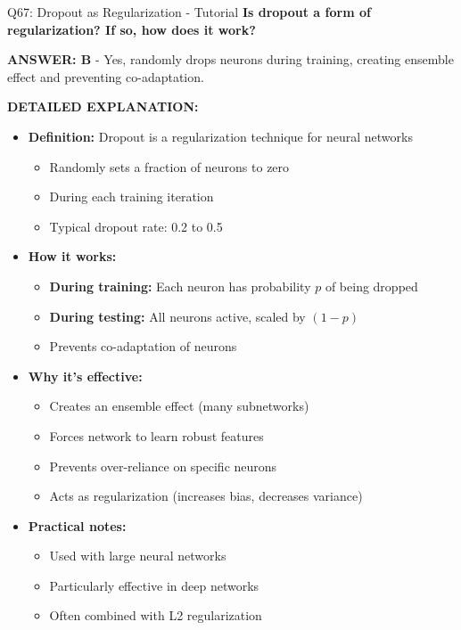 \documentclass[8pt]{beamer}
\begin{document}
	\begin{frame}{Q67: Dropout as Regularization - Tutorial}
		\fontsize{6.5}{7.5}\selectfont
		\textbf{Is dropout a form of regularization? If so, how does it work?}
		
		\vspace{0.05cm}
		\textcolor{myblue}{\textbf{ANSWER: B}} - Yes, randomly drops neurons during training, creating ensemble effect and preventing co-adaptation.
		
		\vspace{0.05cm}
		\textbf{DETAILED EXPLANATION:}
		\begin{itemize}
			\item \textbf{Definition:} Dropout is a regularization technique for neural networks
			\begin{itemize}
				\item Randomly sets a fraction of neurons to zero
				\item During each training iteration
				\item Typical dropout rate: 0.2 to 0.5
			\end{itemize}
			\item \textbf{How it works:}
			\begin{itemize}
				\item \textbf{During training:} Each neuron has probability $p$ of being dropped
				\item \textbf{During testing:} All neurons active, scaled by $(1-p)$
				\item Prevents co-adaptation of neurons
			\end{itemize}
			\item \textbf{Why it's effective:}
			\begin{itemize}
				\item Creates an ensemble effect (many subnetworks)
				\item Forces network to learn robust features
				\item Prevents over-reliance on specific neurons
				\item Acts as regularization (increases bias, decreases variance)
			\end{itemize}
			\item \textbf{Practical notes:}
			\begin{itemize}
				\item Used with large neural networks
				\item Particularly effective in deep networks
				\item Often combined with L2 regularization
			\end{itemize}
		\end{itemize}
		

\end{frame}
\end{document}
